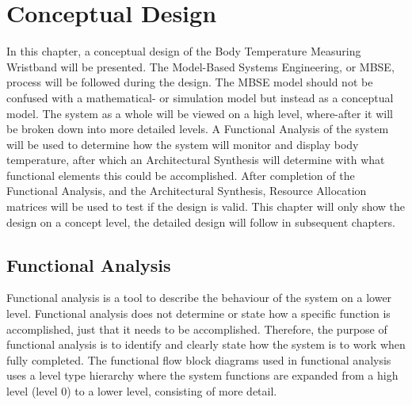 \chapter{Conceptual Design}\label{Ch3}
In this chapter, a conceptual design of the Body Temperature Measuring Wristband will be presented. The Model-Based Systems Engineering, or MBSE, process will be followed during the design. The MBSE model should not be confused with a mathematical- or simulation model but instead as a conceptual model. The system as a whole will be viewed on a high level, where-after it will be broken down into more detailed levels. A Functional Analysis of the system will be used to determine how the system will monitor and display body temperature, after which an Architectural Synthesis will determine with what functional elements this could be accomplished. After completion of the Functional Analysis, and the Architectural Synthesis, Resource Allocation matrices will be used to test if the design is valid. This chapter will only show the design on a concept level, the detailed design will follow in subsequent chapters. 

\section{Functional Analysis}
Functional analysis is a tool to describe the behaviour of the system on a lower level. Functional analysis does not determine or state how a specific function is accomplished, just that it needs to be accomplished. Therefore, the purpose of functional analysis is to identify and clearly state how the system is to work when fully completed. The functional flow block diagrams used in functional analysis uses a level type hierarchy where the system functions are expanded from a high level (level 0) to a lower level, consisting of more detail.  


